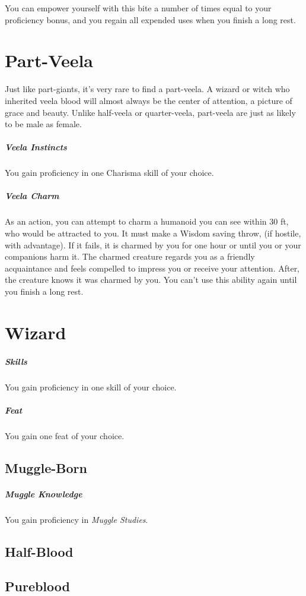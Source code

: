 \documentclass[a4paper,twocolumn,openany,nodeprecatedcode]{dndbook}
\begin{document}
        You can empower yourself with this bite a number of times equal to your proficiency bonus, and you regain all expended uses when you finish a long rest.


    \section{Part-Veela}

        Just like part-giants, it's very rare to find a part-veela. A wizard or witch who inherited veela blood will almost always be the center of attention, a picture of grace and beauty. Unlike half-veela or quarter-veela, part-veela are just as likely to be male as female.

        \subparagraph{Veela Instincts} You gain proficiency in one Charisma skill of your choice.
        \subparagraph{Veela Charm} As an action, you can attempt to charm a humanoid you can see within 30 ft, who would be attracted to you. It must make a Wisdom saving throw, (if hostile, with advantage). If it fails, it is charmed by you for one hour or until you or your companions harm it. The charmed creature regards you as a friendly acquaintance and feels compelled to impress you or receive your attention. After, the creature knows it was charmed by you. You can't use this ability again until you finish a long rest.


    \section{Wizard}

        \subparagraph{Skills} You gain proficiency in one skill of your choice.
        \subparagraph{Feat} You gain one feat of your choice.


        \subsection{Muggle-Born}

        \subparagraph{Muggle Knowledge} You gain proficiency in \textit{Muggle Studies}.


        \subsection{Half-Blood}


        \subsection{Pureblood}
\end{document}
